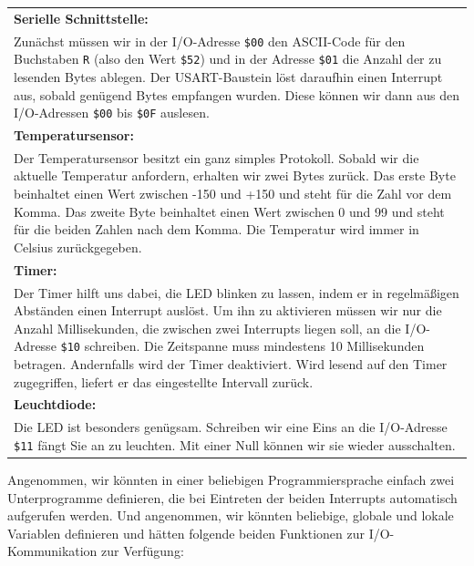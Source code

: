 \bigskip
{
    \setlength{\tabcolsep}{0pt}
    \small

    \begin{tabularx}{\textwidth}{X}
        \textbf{Serielle Schnittstelle:}
        \\
        Zunächst müssen wir in der I/O-Adresse \texttt{\$00} den ASCII-Code für den
        Buchstaben \texttt{R} (also den Wert \texttt{\$52}) und in der Adresse \texttt{\$01}
        die Anzahl der zu lesenden Bytes ablegen. Der USART-Baustein löst daraufhin einen
        Interrupt aus, sobald genügend Bytes empfangen wurden. Diese können wir dann
        aus den I/O-Adressen \texttt{\$00} bis \texttt{\$0F} auslesen.
        \\

        \smallskip
        \textbf{Temperatursensor:}
        \\
        Der Temperatursensor besitzt ein ganz simples Protokoll. Sobald wir die aktuelle
        Temperatur anfordern, erhalten wir zwei Bytes zurück. Das erste Byte beinhaltet
        einen Wert zwischen -150 und +150 und steht für die Zahl vor dem Komma. Das zweite
        Byte beinhaltet einen Wert zwischen 0 und 99 und steht für die beiden Zahlen
        nach dem Komma. Die Temperatur wird immer in Celsius zurückgegeben.
        \\

        \smallskip
        \textbf{Timer:}
        \\
        Der Timer hilft uns dabei, die LED blinken zu lassen, indem er in regelmäßigen
        Abständen einen Interrupt auslöst. Um ihn zu aktivieren müssen wir nur die Anzahl
        Millisekunden, die zwischen zwei Interrupts liegen soll, an die I/O-Adresse
        \texttt{\$10} schreiben. Die Zeitspanne muss mindestens 10 Millisekunden betragen.
        Andernfalls wird der Timer deaktiviert. Wird lesend auf den Timer zugegriffen,
        liefert er das eingestellte Intervall zurück.
        \\

        \smallskip
        \textbf{Leuchtdiode:}
        \\
        Die LED ist besonders genügsam. Schreiben wir eine Eins an die I/O-Adresse
        \texttt{\$11} fängt Sie an zu leuchten. Mit einer Null können wir sie wieder
        ausschalten.
        \\
    \end{tabularx}
}

\clearpage
\teilaufgabe
Angenommen, wir könnten in einer beliebigen Programmiersprache einfach zwei
Unterprogramme definieren, die bei Eintreten der beiden Interrupts automatisch
aufgerufen werden. Und angenommen, wir könnten beliebige, globale und lokale
Variablen definieren und hätten folgende beiden Funktionen zur I/O-Kommunikation
zur Verfügung:


